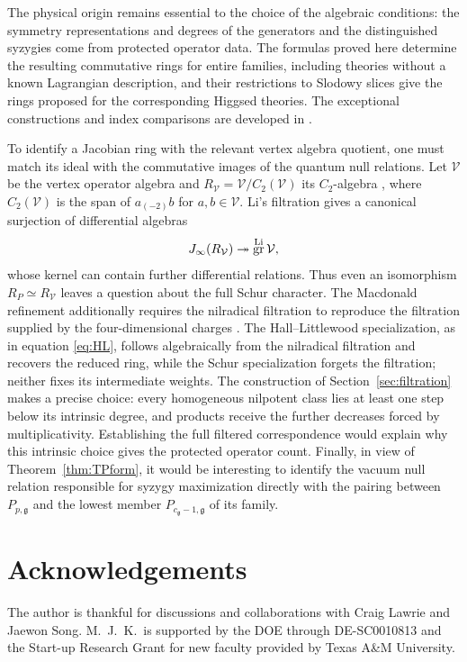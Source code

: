 \documentclass[10pt,reqno]{amsart}
\numberwithin{equation}{section}
\theoremstyle{plain}
\theoremstyle{definition}
\DeclareMathOperator{\gr}{gr}
\begin{document}
The physical origin remains essential to the choice of the algebraic conditions: the symmetry representations and degrees of the generators and the distinguished syzygies come from protected operator data. The formulas proved here determine the resulting commutative rings for entire families, including theories without a known Lagrangian description, and their restrictions to Slodowy slices give the rings proposed for the corresponding Higgsed theories. The exceptional constructions and index comparisons are developed in \cite{Kang:2026ney}.

To identify a Jacobian ring with the relevant vertex algebra quotient, one must match its ideal with the commutative images of the quantum null relations. Let $\mathcal V$ be the vertex operator algebra and $R_{\mathcal V}=\mathcal V/C_2(\mathcal V)$ its $C_2$-algebra \cite{Zhu,ArakawaC2}, where $C_2(\mathcal V)$ is the span of $a_{(-2)}b$ for $a,b\in\mathcal V$. Li's filtration \cite{Li} gives a canonical surjection of differential algebras \cite{AL}
\begin{equation*}
	J_\infty(R_{\mathcal V})\twoheadrightarrow\gr^{\rm Li}\mathcal V,
\end{equation*}
whose kernel can contain further differential relations. Thus even an isomorphism $R_P\simeq R_{\mathcal V}$ leaves a question about the full Schur character. The Macdonald refinement additionally requires the nilradical filtration to reproduce the filtration supplied by the four-dimensional charges \cite{Song:2016yfd}. The Hall--Littlewood specialization, as in equation \eqref{eq:HL}, follows algebraically from the nilradical filtration and recovers the reduced ring, while the Schur specialization forgets the filtration; neither fixes its intermediate weights. The construction of Section~\ref{sec:filtration} makes a precise choice: every homogeneous nilpotent class lies at least one step below its intrinsic degree, and products receive the further decreases forced by multiplicativity. Establishing the full filtered correspondence would explain why this intrinsic choice gives the protected operator count. Finally, in view of Theorem~\ref{thm:TPform}, it would be interesting to identify the vacuum null relation responsible for syzygy maximization directly with the pairing between $P_{p,\mathfrak{g}}$ and the lowest member $P_{c_\mathfrak{g}-1,\mathfrak{g}}$ of its family.

\section*{Acknowledgements}

The author is thankful for discussions and collaborations with Craig Lawrie and Jaewon Song. M.~J.~K.\ is supported by the DOE through DE-SC0010813 and the Start-up Research Grant for new faculty provided by Texas A\&M University.

{}

\end{document}
